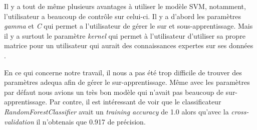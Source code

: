 \documentclass[12pt]{extarticle}
\let\cite\parencite
\begin{document}
Il y a tout de même plusieurs avantages à utiliser le modèle SVM, notamment, l'utilisateur a beaucoup de contrôle sur celui-ci. Il y a d'abord les paramètres \emph{gamma} et \emph{C} qui permet a l'utilisateur de gérer le sur et sous-apprentissage. Mais il y a surtout le paramètre \emph{kernel} qui permet à l'utilisateur d'utiliser sa propre matrice pour un utilisateur qui aurait des connaissances expertes sur ses données \cite{sklearn}.

En ce qui concerne notre travail, il nous a pas été trop difficile de trouver des paramètres adequa afin de gérer le sur-apprentissage. Même avec les paramètres par défaut nous avions un très bon modèle qui n'avait pas beaucoup de sur-apprentissage. Par contre, il est intéressant de voir que le classificateur \emph{RandomForestClassifier} avait un \emph{training accuracy} de 1.0 alors qu'avec la \emph{cross-validation} il n'obtenais que 0.917 de précision.

\newpage
{}
{}
\printbibliography
\end{document}
